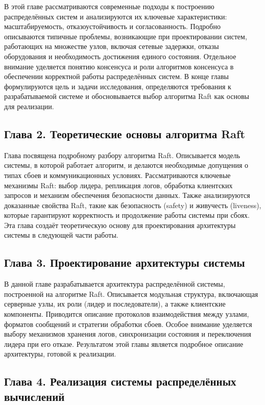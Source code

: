 В этой главе рассматриваются современные подходы к построению распределённых
систем и анализируются их ключевые характеристики: масштабируемость,
отказоустойчивость и согласованность. Подробно описываются типичные проблемы,
возникающие при проектировании систем, работающих на множестве узлов, включая
сетевые задержки, отказы оборудования и необходимость достижения единого
состояния. Отдельное внимание уделяется понятию консенсуса и роли алгоритмов
консенсуса в обеспечении корректной работы распределённых систем. В конце главы
формулируются цель и задачи исследования, определяются требования к
разрабатываемой системе и обосновывается выбор алгоритма Raft как основы для
реализации.

\subsection*{Глава 2. Теоретические основы алгоритма Raft}

Глава посвящена подробному разбору алгоритма Raft. Описывается модель системы,
в которой работает алгоритм, и делаются необходимые допущения о типах сбоев и
коммуникационных условиях. Рассматриваются ключевые механизмы Raft: выбор
лидера, репликация логов, обработка клиентских запросов и механизм обеспечения
безопасности данных. Также анализируются доказанные свойства Raft, такие как
безопасность (safety) и живучесть (liveness), которые гарантируют корректность
и продолжение работы системы при сбоях. Эта глава создаёт теоретическую основу
для проектирования архитектуры системы в следующей части работы.

\subsection*{Глава 3. Проектирование архитектуры системы}

В данной главе разрабатывается архитектура распределённой системы, построенной
на алгоритме Raft. Описывается модульная структура, включающая серверные узлы,
их роли (лидер и последователи), а также клиентские компоненты. Приводится
описание протоколов взаимодействия между узлами, форматов сообщений и стратегии
обработки сбоев. Особое внимание уделяется выбору механизмов хранения логов,
синхронизации состояния и переключения лидера при его отказе. Результатом этой
главы является подробное описание архитектуры, готовой к реализации.

\subsection*{Глава 4. Реализация системы распределённых вычислений}


